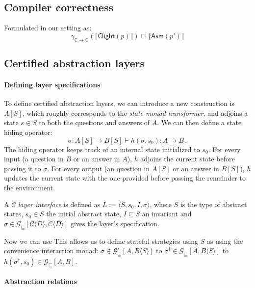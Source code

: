 \documentclass[format=sigplan,authordraft]{acmart}
\newcommand{\gcat}{\mathcal{G}_{\sqsubseteq}}
\newcommand{\kw}[1]{\ensuremath{ \mathsf{#1} }}
\begin{document}

\subsection{Compiler correctness} %

Formulated in our setting as:
\[
    \gamma_{\mathbb{C} \twoheadrightarrow \mathbb{C}}
          (\llbracket \kw{Clight}(p) \rrbracket) \sqsubseteq
    \llbracket \kw{Asm}(p') \rrbracket
\]


\subsection{Certified abstraction layers} %

\paragraph{Defining layer specifications} %

To define certified abstraction layers,
we can introduce a new construction is $A[S]$,
which roughly corresponds to the \emph{state monad transformer},
and adjoins a state $s \in S$ to both the questions and answers of $A$.
We can then define a state hiding operator:
\[
    \sigma : A[S] \rightarrow B[S] \vdash
    h(\sigma, s_0) : A \rightarrow B \,.
\]
The hiding operator keeps track of an internal state
initialized to $s_0$.
For every input (a question in $B$ or an answer in $A$),
$h$ adjoins the current state before passing it to $\sigma$.
For every output (an question in $A[S]$ or an answer in $B[S]$),
$h$ updates the current state with the one provided
before passing the remainder to the environment.

A $\mathcal{C}$ \emph{layer interface} is defined as
$L := \langle S, s_0, I, \sigma \rangle$,
where $S$ is the type of abstract states,
$s_0 \in S$ the initial abstract state,
$I \subseteq S$ an invariant and
$\sigma \in
 \gcat[\mathcal{C}\langle D \rangle, \mathcal{C}\langle D \rangle]$
gives the layer's specification.



Now we can use 
This allows us to define stateful strategies
using $S$ as 
using the convenience interaction monad:
$\sigma \in \gcat^i[A, B \langle S \rangle]$
to $\sigma^\dagger \in \gcat[A, B \langle S \rangle]$
to $h(\sigma^\dagger, s_0) \in \gcat[A, B]$.


\paragraph{Abstraction relations} %
\end{document}
